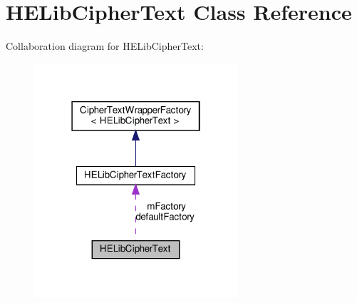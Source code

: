 \hypertarget{classHELibCipherText}{}\section{H\+E\+Lib\+Cipher\+Text Class Reference}
\label{classHELibCipherText}


Collaboration diagram for H\+E\+Lib\+Cipher\+Text\+:
\nopagebreak
\begin{figure}[H]
\begin{center}
\leavevmode
\includegraphics[width=214pt]{classHELibCipherText__coll__graph}
\end{center}
\end{figure}

